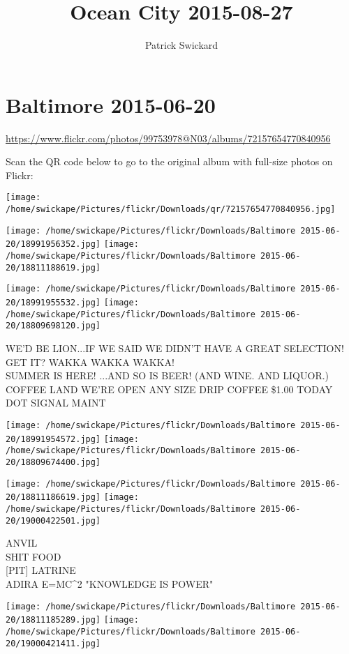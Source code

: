 \documentclass[10pt,letterpaper]{article}
\title{Ocean City 2015-08-27}
\author{Patrick Swickard}
\date{}
\begin{document}
\section*{Baltimore 2015-06-20}

\url{https://www.flickr.com/photos/99753978@N03/albums/72157654770840956}

Scan the QR code below to go to the original album with full-size photos on Flickr:

\texttt{[image: /home/swickape/Pictures/flickr/Downloads/qr/72157654770840956.jpg]}
\pagebreak

\texttt{[image: /home/swickape/Pictures/flickr/Downloads/Baltimore 2015-06-20/18991956352.jpg]}
\texttt{[image: /home/swickape/Pictures/flickr/Downloads/Baltimore 2015-06-20/18811188619.jpg]}

\texttt{[image: /home/swickape/Pictures/flickr/Downloads/Baltimore 2015-06-20/18991955532.jpg]}
\texttt{[image: /home/swickape/Pictures/flickr/Downloads/Baltimore 2015-06-20/18809698120.jpg]}

WE'D BE LION...IF WE SAID WE DIDN'T HAVE A GREAT SELECTION!  GET IT?  WAKKA WAKKA WAKKA!\\
SUMMER IS HERE!  ...AND SO IS BEER!  (AND WINE.  AND LIQUOR.)\\
COFFEE LAND WE'RE OPEN ANY SIZE DRIP COFFEE \$1.00 TODAY\\
DOT SIGNAL MAINT
\pagebreak

\texttt{[image: /home/swickape/Pictures/flickr/Downloads/Baltimore 2015-06-20/18991954572.jpg]}
\texttt{[image: /home/swickape/Pictures/flickr/Downloads/Baltimore 2015-06-20/18809674400.jpg]}

\texttt{[image: /home/swickape/Pictures/flickr/Downloads/Baltimore 2015-06-20/18811186619.jpg]}
\texttt{[image: /home/swickape/Pictures/flickr/Downloads/Baltimore 2015-06-20/19000422501.jpg]}

ANVIL\\
SHIT FOOD\\
{[}PIT{]} LATRINE\\
ADIRA E=MC\^{}2 "KNOWLEDGE IS POWER"
\pagebreak

\texttt{[image: /home/swickape/Pictures/flickr/Downloads/Baltimore 2015-06-20/18811185289.jpg]}
\texttt{[image: /home/swickape/Pictures/flickr/Downloads/Baltimore 2015-06-20/19000421411.jpg]}
\end{document}

